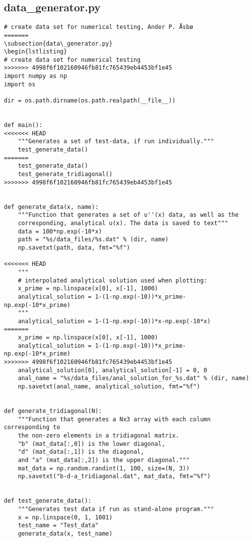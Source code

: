 \documentclass[english,notitlepage]{revtex4-1}  %
\begin{document}
\subsection{data\_generator.py} \label{A:3}
\begin{lstlisting}
# create data set for numerical testing, Ander P. Åsbø
=======
\subsection{data\_generator.py}
\begin{lstlisting}
# create data set for numerical testing
>>>>>>> 4998f6f102160946fb81fc765439eb4453bf1e45
import numpy as np
import os

dir = os.path.dirname(os.path.realpath(__file__))


def main():
<<<<<<< HEAD
    """Generates a set of test-data, if run individually."""
    test_generate_data()
=======
    test_generate_data()
    test_generate_tridiagonal()
>>>>>>> 4998f6f102160946fb81fc765439eb4453bf1e45


def generate_data(x, name):
    """Function that generates a set of u''(x) data, as well as the
    corresponding, analytical u(x). The data is saved to text"""
    data = 100*np.exp(-10*x)
    path = "%s/data_files/%s.dat" % (dir, name)
    np.savetxt(path, data, fmt="%f")

<<<<<<< HEAD
    """
    # interpolated analytical solution used when plotting:
    x_prime = np.linspace(x[0], x[-1], 1000)
    analytical_solution = 1-(1-np.exp(-10))*x_prime-np.exp(-10*x_prime)
    """
    analytical_solution = 1-(1-np.exp(-10))*x-np.exp(-10*x)
=======
    x_prime = np.linspace(x[0], x[-1], 1000)
    analytical_solution = 1-(1-np.exp(-10))*x_prime-np.exp(-10*x_prime)
>>>>>>> 4998f6f102160946fb81fc765439eb4453bf1e45
    analytical_solution[0], analytical_solution[-1] = 0, 0
    anal_name = "%s/data_files/anal_solution_for_%s.dat" % (dir, name)
    np.savetxt(anal_name, analytical_solution, fmt="%f")


def generate_tridiagonal(N):
    """Function that generates a Nx3 array with each column corresponding to
    the non-zero elements in a tridiagonal matrix.
    "b" (mat_data[:,0]) is the lower diagonal,
    "d" (mat_data[:,1]) is the diagonal,
    and "a" (mat_data[:,2]) is the upper diagonal."""
    mat_data = np.random.randint(1, 100, size=(N, 3))
    np.savetxt("b-d-a_tridiagonal.dat", mat_data, fmt="%f")


def test_generate_data():
    """Generates test data if run as stand-alone program."""
    x = np.linspace(0, 1, 1001)
    test_name = "Test_data"
    generate_data(x, test_name)



\end{lstlisting}
\end{document}

